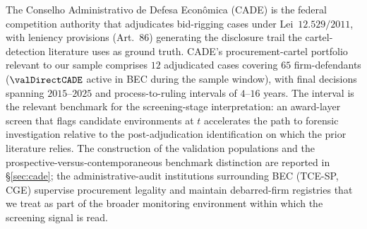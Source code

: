 The Conselho Administrativo de Defesa Econ\^omica (CADE) is the
federal competition authority that adjudicates bid-rigging cases
under Lei~$12.529/2011$, with leniency provisions (Art.~$86$)
generating the disclosure trail the cartel-detection literature
uses as ground truth. CADE's procurement-cartel portfolio
relevant to our sample comprises $12$ adjudicated cases covering
$65$ firm-defendants ($\valDirectCADE$ active in BEC during the
sample window), with final decisions spanning $2015$--$2025$ and
process-to-ruling intervals of $4$--$16$ years. The interval is
the relevant benchmark for the screening-stage interpretation:
an award-layer screen that flags candidate environments at $t$
accelerates the path to forensic investigation relative to the
post-adjudication identification on which the prior literature
relies. The construction of the validation populations and the
prospective-versus-contemporaneous benchmark distinction are
reported in \S\ref{sec:cade}; the administrative-audit
institutions surrounding BEC (TCE-SP, CGE) supervise procurement
legality and maintain debarred-firm registries that we treat as
part of the broader monitoring environment within which the
screening signal is read.
